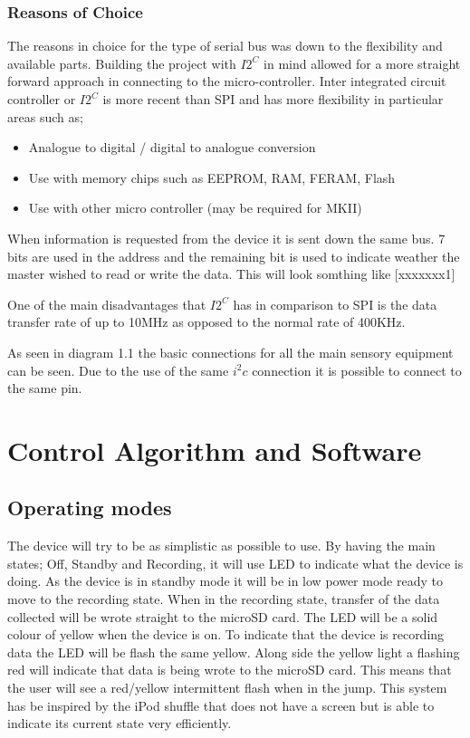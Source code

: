 \documentclass{report}
\begin{document}
\subsection{Reasons of Choice}
The reasons in choice for the type of serial bus was down to the flexibility and available parts. Building the project with $I2^C$ in mind allowed for a more straight forward approach in connecting to the micro-controller. Inter integrated circuit controller or $I2^C$ is more recent than SPI and has more flexibility in particular areas such as;

\begin{itemize}
\item Analogue to digital / digital to analogue conversion 
\item Use with memory chips such as EEPROM, RAM, FERAM, Flash
\item Use with other micro controller (may be required for MKII)
\end{itemize}

When information is requested from the device it is sent down the same bus. 7 bits are used in the address and the remaining bit is used to indicate weather the master wished to read or write the data. This will look somthing like [xxxxxxx1]

One of the main disadvantages that $I2^C$ has in comparison to SPI is the data transfer rate of up to 10MHz as opposed to the normal rate of 400KHz. 

As seen in diagram 1.1 the basic connections for all the main sensory equipment can be seen. Due to the use of the same $i^2c$ connection it is possible to connect to the same pin. 


\newpage
\chapter{Control Algorithm and Software}


\section{Operating modes}
The device will try to be as simplistic as possible to use. By having the main states; Off, Standby and Recording, it will use LED to indicate what the device is doing. As the device is in standby mode it will be in low power mode ready  to move to the recording state. When in the recording state, transfer of the data collected will be wrote straight to the microSD card. The LED will be a solid colour of yellow when the device is on. To indicate that the device is recording data the LED will be flash the same yellow. Along side the yellow light a flashing red will indicate that data is being wrote to the microSD card. This means that the user will see a red/yellow intermittent flash when in the jump. This system has be inspired by the iPod shuffle that does not have a screen but is able to indicate its current state very efficiently.
\end{document}
